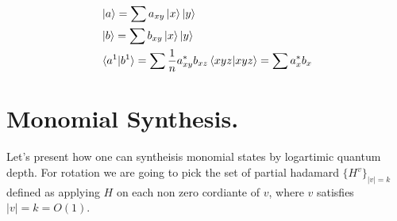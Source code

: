 \documentclass[manuscript,screen,review]{acmart}
\begin{document}
\begin{equation*}
  \begin{split}
    & \ket{a} = \sum a_{xy}\ket{x}\ket{y} \\
    & \ket{b} = \sum b_{xy}\ket{x}\ket{y} \\ 
    & \braket{a^{1}|b^{1}} = \sum \frac{1}{n}a_{xy}^{*}b_{xz}\braket{xyz|xyz} = \sum a_{x}^{*}b_{x}
  \end{split}
\end{equation*}


 


\section{Monomial Synthesis.}
Let's present how one can syntheisis monomial states by logartimic quantum depth. For rotation we are going to pick the set of partial hadamard $\{H^{v}\}_{|v| = k} $ defined as applying $H$ on each non zero cordiante of $v$, where $v$ satisfies $|v| = k = O(1)$.  

\printbibliography
\end{document}
